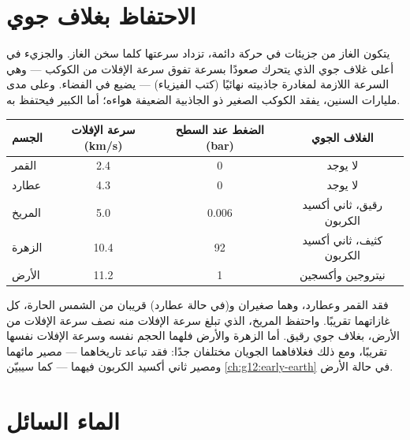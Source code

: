 \section{الاحتفاظ بغلاف جوي}

يتكون الغاز من جزيئات في حركة دائمة، تزداد سرعتها كلما سخن الغاز. والجزيء في
أعلى غلاف جوي الذي يتحرك صعودًا بسرعة تفوق سرعة الإفلات من الكوكب --- وهي
السرعة اللازمة لمغادرة جاذبيته نهائيًا (كتب الفيزياء) --- يضيع في الفضاء. وعلى
مدى مليارات السنين، يفقد الكوكب الصغير ذو الجاذبية الضعيفة هواءه؛ أما الكبير
فيحتفظ به.

\begin{center}
\small
\begin{tabular}{lccc}
\hline
الجسم & سرعة الإفلات (\unit{km/s}) & الضغط عند السطح (bar) & الغلاف الجوي \\
\hline
القمر & 2.4 & 0 & لا يوجد \\
عطارد & 4.3 & 0 & لا يوجد \\
المريخ & 5.0 & 0.006 & رقيق، ثاني أكسيد الكربون \\
الزهرة & 10.4 & 92 & كثيف، ثاني أكسيد الكربون \\
الأرض & 11.2 & 1 & نيتروجين وأكسجين \\
\hline
\end{tabular}
\end{center}

\begin{remark}\label{rem:g10:habitable-planet:size}
فقد القمر وعطارد، وهما صغيران و(في حالة عطارد) قريبان من الشمس الحارة، كل
غازاتهما تقريبًا. واحتفظ المريخ، الذي تبلغ سرعة الإفلات منه نصف سرعة الإفلات
من الأرض، بغلاف جوي رقيق. أما الزهرة والأرض فلهما الحجم نفسه وسرعة الإفلات
نفسها تقريبًا، ومع ذلك فغلافاهما الجويان مختلفان جدًا: فقد تباعد تاريخاهما ---
مصير مائهما ومصير ثاني أكسيد الكربون فيهما --- كما سيبيّن
\cref{ch:g12:early-earth} في حالة الأرض.
\end{remark}

\section{الماء السائل}

